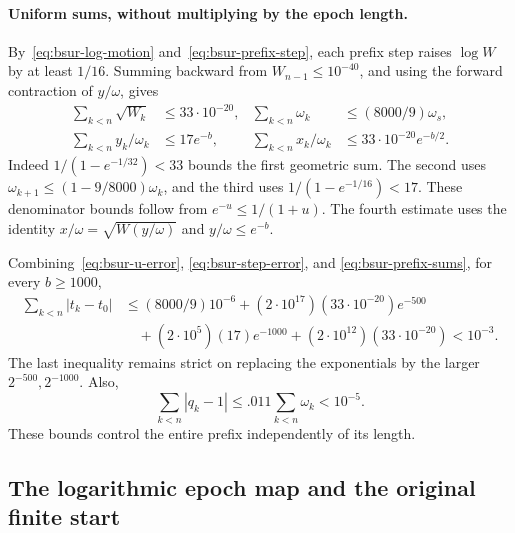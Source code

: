 \paragraph{Uniform sums, without multiplying by the epoch length.}
By~\eqref{eq:bsur-log-motion} and~\eqref{eq:bsur-prefix-step}, each prefix
step raises $\log W$ by at least $1/16$. Summing backward from
$W_{n-1}\le10^{-40}$, and using the forward contraction of $y/\omega$, gives
\begin{equation}\label{eq:bsur-prefix-sums}
 \begin{aligned}
 \sum_{k<n}\sqrt{W_k}&\le33\cdot10^{-20},&
 \sum_{k<n}\omega_k&\le(8000/9)\omega_s,\\
 \sum_{k<n}y_k/\omega_k&\le17e^{-b},&
 \sum_{k<n}x_k/\omega_k&\le33\cdot10^{-20}e^{-b/2}.
 \end{aligned}
\end{equation}
Indeed $1/(1-e^{-1/32})<33$ bounds the first geometric sum. The second uses
$\omega_{k+1}\le(1-9/8000)\omega_k$, and the third uses
$1/(1-e^{-1/16})<17$. These denominator bounds follow from
$e^{-u}\le1/(1+u)$. The fourth estimate uses the identity
$x/\omega=\sqrt{W(y/\omega)}$ and $y/\omega\le e^{-b}$.

Combining~\eqref{eq:bsur-u-error}, \eqref{eq:bsur-step-error}, and
\eqref{eq:bsur-prefix-sums}, for every $b\ge1000$,
\begin{equation}\label{eq:bsur-total-step-error}
 \begin{aligned}
 \sum_{k<n}|t_k-t_0|
 &\le(8000/9)10^{-6}
 +(2\cdot10^{17})(33\cdot10^{-20})e^{-500}\\
 &\quad +(2\cdot10^5)(17)e^{-1000}
 +(2\cdot10^{12})(33\cdot10^{-20})
 <10^{-3}.
 \end{aligned}
\end{equation}
The last inequality remains strict on replacing the exponentials by the larger
$2^{-500},2^{-1000}$. Also,
\begin{equation}\label{eq:bsur-total-q-error}
 \sum_{k<n}|q_k-1|\le.011\sum_{k<n}\omega_k<10^{-5}.
\end{equation}
These bounds control the entire prefix independently of its length.

\subsection{The logarithmic epoch map and the original finite start}
\label{sec:bsur-map}

